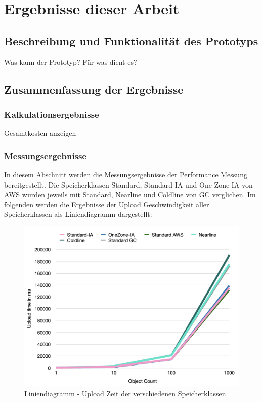 \chapter{Ergebnisse dieser Arbeit}

\section{Beschreibung und Funktionalität des Prototyps}

Was kann der Prototyp?
Für was dient es?

\section{Zusammenfassung der Ergebnisse}

\subsection{Kalkulationsergebnisse}

Gesamtkosten anzeigen

\subsection{Messungsergebnisse}

In diesem Abschnitt werden die Messungsergebnisse der Performance Messung bereitgestellt. Die Speicherklassen Standard, Standard-IA und One Zone-IA von AWS wurden jeweils mit Standard, Nearline und Coldline von GC verglichen. Im folgenden werden die Ergebnisse der Upload Geschwindigkeit aller Speicherklassen als Liniendiagramm dargestellt:

\begin{figure}[h]
	\centering
	\includegraphics[width=13cm,keepaspectratio]{Pictures/UploadTime.png}
	\caption{Liniendiagramm - Upload Zeit der verschiedenen Speicherklassen}
\end{figure}	

